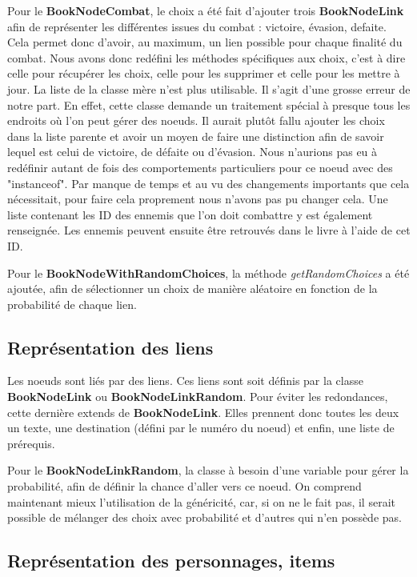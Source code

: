 			Pour le \textbf{BookNodeCombat}, le choix a été fait d'ajouter trois \textbf{BookNodeLink} afin de représenter les différentes issues du combat : victoire, évasion, defaite. Cela permet donc d'avoir, au maximum, un lien possible pour chaque finalité du combat. Nous avons donc redéfini les méthodes spécifiques aux choix, c'est à dire celle pour récupérer les choix, celle pour les supprimer et celle pour les mettre à jour. La liste de la classe mère n'est plus utilisable. Il s'agit d'une grosse erreur de notre part. En effet, cette classe demande un traitement spécial à presque tous les endroits où l'on peut gérer des noeuds. Il aurait plutôt fallu ajouter les choix dans la liste parente et avoir un moyen de faire une distinction afin de savoir lequel est celui de victoire, de défaite ou d'évasion. Nous n'aurions pas eu à redéfinir autant de fois des comportements particuliers pour ce noeud avec des "instanceof". Par manque de temps et au vu des changements importants que cela nécessitait, pour faire cela proprement nous n'avons pas pu changer cela. Une liste contenant les ID des ennemis que l'on doit combattre y est également renseignée. Les ennemis peuvent ensuite être retrouvés dans le livre à l'aide de cet ID.

			Pour le \textbf{BookNodeWithRandomChoices}, la méthode \textit{getRandomChoices} a été ajoutée, afin de sélectionner un choix de manière aléatoire en fonction de la probabilité de chaque lien.

		\subsection{Représentation des liens}
			\label{subsec:liens}

			Les noeuds sont liés par des liens. Ces liens sont soit définis par la classe \textbf{BookNodeLink} ou \textbf{BookNodeLinkRandom}. Pour éviter les redondances, cette dernière extends de \textbf{BookNodeLink}. Elles prennent donc toutes les deux un texte, une destination (défini par le numéro du noeud) et enfin, une liste de prérequis.

			Pour le \textbf{BookNodeLinkRandom}, la classe à besoin d'une variable pour gérer la probabilité, afin de définir la chance d'aller vers ce noeud. On comprend maintenant mieux l'utilisation de la généricité, car, si on ne le fait pas, il serait possible de mélanger des choix avec probabilité et d'autres qui n'en possède pas.

		\subsection{Représentation des personnages, items}

